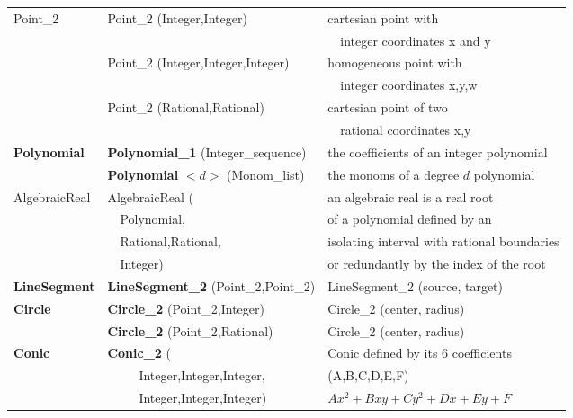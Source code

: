 \begin{ccTexOnly}
\begin{tabular}{*{3}{| l} |}
Point\_2 & Point\_2 (Integer,Integer)     & cartesian point with \\
         &                                & \ \ integer coordinates x and y \\
         & Point\_2 (Integer,Integer,Integer) & homogeneous point with \\ 
         &                                & \ \ integer coordinates x,y,w\\
         & Point\_2 (Rational,Rational)   & cartesian point of two \\
         &                                & \ \ rational coordinates x,y\\ \hline
{\bf Polynomial}    & {\bf Polynomial\_1} (Integer\_sequence) 
                             & the coefficients of an integer polynomial \\ \hline
                    & {\bf Polynomial} $<d>$ (Monom\_list)
                             & the monoms of a degree $d$ polynomial \\ \hline

AlgebraicReal & AlgebraicReal (         & an algebraic real is a real root\\
              & \ \ Polynomial,         & of a polynomial defined by an\\
              & \ \ Rational,Rational,  & isolating interval with rational boundaries\\
              & \ \ Integer)            & or redundantly by the index of the root\\ \hline

{\bf LineSegment} & {\bf LineSegment\_2} (Point\_2,Point\_2) & LineSegment\_2 (source, target) \\ \hline

{\bf Circle}   & {\bf Circle\_2} (Point\_2,Integer) & Circle\_2 (center, radius) \\ 
               & {\bf Circle\_2} (Point\_2,Rational) & Circle\_2 (center, radius) \\ \hline

{\bf Conic}  & {\bf Conic\_2} (
                               & Conic defined by its 6 coefficients \\
             & \ \ \ \ \ Integer,Integer,Integer,
                     &  (A,B,C,D,E,F) \\
             & \ \ \ \ \ Integer,Integer,Integer)        
                     &  \begin{math} Ax^2+Bxy+Cy^2+Dx+Ey+F \end{math}\\ \hline


\end{tabular}
\end{ccTexOnly}
